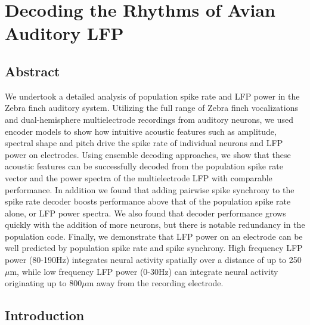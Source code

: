 \chapter{Decoding the Rhythms of Avian Auditory LFP}

\section{Abstract}
We undertook a detailed analysis of population spike rate and LFP power in the Zebra finch auditory system. Utilizing the full range of Zebra finch vocalizations and dual-hemisphere multielectrode recordings from auditory neurons, we used encoder models to show how intuitive acoustic features such as amplitude, spectral shape and pitch drive the spike rate of individual neurons and  LFP power on electrodes. Using ensemble decoding approaches, we show that these acoustic features can be successfully decoded from the population spike rate vector and the power spectra of the multielectrode LFP with comparable performance. In addition we found that adding pairwise spike synchrony to the spike rate decoder boosts performance above that of the population spike rate alone, or LFP power spectra. We also found that decoder performance grows quickly with the addition of more neurons, but there is notable redundancy in the population code. Finally, we demonstrate that LFP power on an electrode can be well predicted by population spike rate and spike synchrony. High frequency LFP power (80-190Hz) integrates neural activity spatially over a distance of up to 250$\mu$m, while low frequency LFP power (0-30Hz) can integrate neural activity originating up to 800$\mu$m away from the recording electrode.



\section{Introduction}

